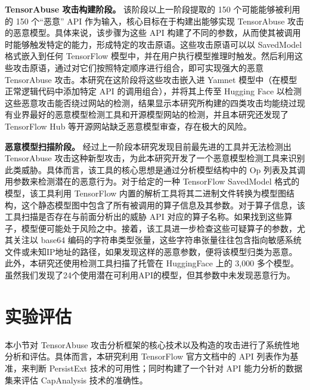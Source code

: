 \textbf{TensorAbuse 攻击构建阶段。}
该阶段以上一阶段提取的 150 个可能能够被利用的 150 个“恶意” API 作为输入，核心目标在于构建出能够实现 TensorAbuse 攻击的恶意模型。具体来说，该步骤为这些 API 构建了不同的参数，从而使其被调用时能够触发特定的能力，形成特定的攻击原语。这些攻击原语可以以 SavedModel 格式嵌入到任何 TensorFlow 模型中，并在用户执行模型推理时触发。然后利用这些攻击原语，通过对它们按照特定顺序进行组合，即可实现强大的恶意 TensorAbuse 攻击。本研究在这阶段将这些攻击嵌入进 Yamnet 模型中（在模型正常逻辑代码中添加特定 API 的调用组合），并将其上传至 Hugging Face 以检测这些恶意攻击能否绕过网站的检测，结果显示本研究所构建的四类攻击均能绕过现有业界最好的恶意模型检测工具和开源模型网站的检测，并且本研究还发现了 TensorFlow Hub 等开源网站缺乏恶意模型审查，存在极大的风险。

\textbf{恶意模型扫描阶段。}
经过上一阶段本研究发现目前最先进的工具并无法检测出 TensorAbuse 攻击这种新型攻击，为此本研究开发了一个恶意模型检测工具来识别此类威胁。具体而言，该工具的核心思想是通过分析模型结构中的 Op 列表及其调用参数来检测潜在的恶意行为。对于给定的一种 TensorFlow SavedModel 格式的模型，该工具利用 TensorFlow 内置的解析工具将其二进制文件转换为模型图结构，这个静态模型图中包含了所有被调用的算子信息及其参数。对于算子信息，该工具扫描是否存在与前面分析出的威胁 API 对应的算子名称。如果找到这些算子，模型便可能处于风险之中。接着，该工具进一步检查这些可疑算子的参数，尤其关注以 base64 编码的字符串类型张量，这些字符串张量往往包含指向敏感系统文件或未知IP地址的路径，如果发现这样的恶意参数，便将该模型归类为恶意。此外，本研究还使用检测工具扫描了托管在 HuggingFace 上的 3,000 多个模型。虽然我们发现了24个使用潜在可利用API的模型，但其参数中未发现恶意行为。

\section{实验评估}
本小节对 TensorAbuse 攻击分析框架的核心技术以及构造的攻击进行了系统性地分析和评估。具体而言，本研究利用 TensorFlow 官方文档中的 API 列表作为基准，来判断 PersistExt 技术的可用性；同时构建了一个针对 API 能力分析的数据集来评估 CapAnalysis 技术的准确性。

